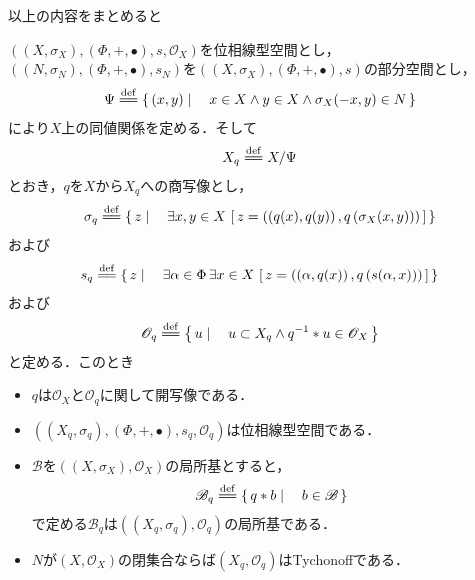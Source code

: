 	以上の内容をまとめると
	\begin{screen}
		\begin{thm}[位相線型空間を部分空間で割ったときの商位相は線型位相である]
			$\left((X,\sigma_X),(\Phi,+,\bullet),s,\mathscr{O}_X\right)$を位相線型空間とし，
			$\left((N,\sigma_N),(\Phi,+,\bullet),s_N\right)$を$\left((X,\sigma_X),(\Phi,+,\bullet),s\right)$の部分空間とし，
			\begin{align}
				\Psi \defeq \Set{(x,y)}{x \in X \wedge y \in X \wedge \sigma_X(-x,y) \in N}
			\end{align}
			により$X$上の同値関係を定める．そして
			\begin{align}
				X_q \defeq X/\Psi
			\end{align}
			とおき，$q$を$X$から$X_q$への商写像とし，
			\begin{align}
				\sigma_q \defeq \Set{z}{\exists x,y \in X\, 
				\left[\, z=\left(\left(q(x),q(y)\right),q\left(\sigma_X(x,y)\right)\right)\, \right]}
			\end{align}
			および
			\begin{align}
				s_q \defeq \Set{z}{\exists \alpha \in \Phi\, \exists x \in X\, 
				\left[\, z=\left(\left(\alpha,q(x)\right),q\left(s(\alpha,x)\right)\right)\, \right]}
			\end{align}
			および
			\begin{align}
				\mathscr{O}_q \defeq \Set{u}{u \subset X_q \wedge q^{-1} \ast u \in \mathscr{O}_X}
			\end{align}
			と定める．このとき
			\begin{itemize}
				\item $q$は$\mathscr{O}_X$と$\mathscr{O}_q$に関して開写像である．
				
				\item $\left(\left(X_q,\sigma_q\right),\left(\Phi,+,\bullet\right),s_q,\mathscr{O}_q\right)$は位相線型空間である．
				
				\item $\mathscr{B}$を$\left((X,\sigma_X),\mathscr{O}_X\right)$の局所基とすると，
					\begin{align}
						\mathscr{B}_q \defeq \Set{q \ast b}{b \in \mathscr{B}}
					\end{align}
					で定める$\mathscr{B}_q$は$\left((X_q,\sigma_q),\mathscr{O}_q\right)$の局所基である．
				
				\item $N$が$(X,\mathscr{O}_X)$の閉集合ならば$(X_q,\mathscr{O}_q)$はTychonoffである．
			\end{itemize}
		\end{thm}
	\end{screen}
